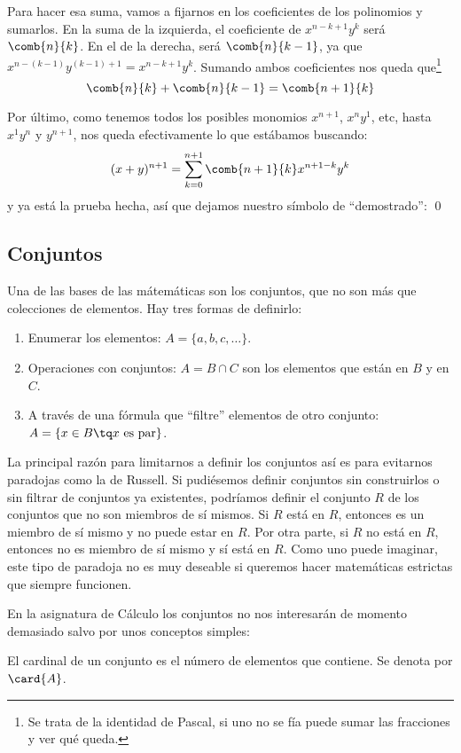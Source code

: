 \documentclass[palatino, nochap]{apuntes}
\begin{document}
Para hacer esa suma, vamos a fijarnos en los coeficientes de los polinomios y sumarlos. En la suma de la izquierda, el coeficiente de $x^{n-k+1}y^{k}$ será $\comb{n}{k}$. En el de la derecha, será $\comb{n}{k-1}$, ya que $x^{n-(k-1)}y^{(k-1)+1} = x^{n-k+1}y^k$. Sumando ambos coeficientes nos queda que\footnote{Se trata de la identidad de Pascal, si uno no se fía puede sumar las fracciones y ver qué queda.} \[ \comb{n}{k} + \comb{n}{k-1} = \comb{n+1}{k} \]

Por último, como tenemos todos los posibles monomios $x^{n+1}$, $x^ny^1$, etc, hasta $x^1y^n$ y $y^{n+1}$, nos queda efectivamente lo que estábamos buscando: \[ (x+y)^{n+1} =\sum_{k=0}^{n+1}\comb{n+1}{k} x^{n+1-k}y^{k}\] y ya está la prueba hecha, así que dejamos nuestro símbolo de ``demostrado'': \qed

\subsection{Conjuntos}

Una de las bases de las mátemáticas son los conjuntos, que no son más que colecciones de elementos. Hay tres formas de definirlo:

\begin{enumerate}
\item Enumerar los elementos: $A=\{a,b,c,\dotsc\}$.
\item Operaciones con conjuntos: $A=B\cap C$ son los elementos que están en $B$ y en $C$.
\item A través de una fórmula que ``filtre'' elementos de otro conjunto: $A=\{x\in B \tq x \text{ es par}\}$.
\end{enumerate}

La principal razón para limitarnos a definir los conjuntos así es para evitarnos paradojas como la de Russell. Si pudiésemos definir conjuntos sin construirlos o sin filtrar de conjuntos ya existentes, podríamos definir el conjunto $R$ de los conjuntos que no son miembros de sí mismos. Si $R$ está en $R$, entonces es un miembro de sí mismo y no puede estar en $R$. Por otra parte, si $R$ no está en $R$, entonces no es miembro de sí mismo y sí está en $R$. Como uno puede imaginar, este tipo de paradoja no es muy deseable si queremos hacer matemáticas estrictas que siempre funcionen.

En la asignatura de Cálculo los conjuntos no nos interesarán de momento demasiado salvo por unos conceptos simples:

\begin{defn} El cardinal de un conjunto es el número de elementos que contiene. Se denota por $\card{A}$.
\end{defn}
\end{document}
